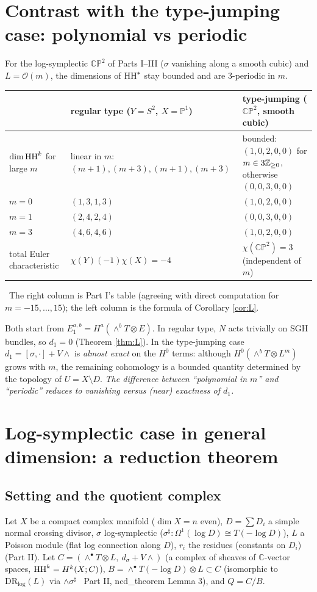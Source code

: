 \section{Contrast with the type-jumping case: polynomial vs periodic}\label{sec:contrast}
For the log-symplectic $\mathbb{CP}^2$ of Parts I--III ($\sigma$ vanishing along a smooth cubic) and $L=\mathcal O(m)$, the dimensions of $\mathrm{HH}^*$ stay bounded and are 3-periodic in $m$.
\begin{center}\small
\begin{tabular}{p{3.6cm}p{4.0cm}p{5.4cm}}\toprule
 & regular type ($Y=S^2$, $X=\mathbb P^1$) & type-jumping ($\mathbb{CP}^2$, smooth cubic)\\\midrule
$\dim\mathrm{HH}^k$ for large $m$ & linear in $m$: $(m+1),(m+3),(m+1),(m+3)$ & bounded: $(1,0,2,0,0)$ for $m\in3\mathbb Z_{\ge0}$, otherwise $(0,0,3,0,0)$\\\midrule
$m=0$ & $(1,3,1,3)$ & $(1,0,2,0,0)$\\\midrule
$m=1$ & $(2,4,2,4)$ & $(0,0,3,0,0)$\\\midrule
$m=3$ & $(4,6,4,6)$ & $(1,0,2,0,0)$\\\midrule
total Euler characteristic & $\chi(Y)(-1)\chi(X)=-4$ & $\chi(\mathbb{CP}^2)=3$ (independent of $m$)\\\bottomrule
\end{tabular}
\end{center}
\tV\ The right column is Part I's table (agreeing with direct computation for $m=-15,\dots,15$); the left column is the formula of Corollary \ref{cor:L}.
\begin{obs}\tP\label{obs:contrast}
Both start from $E_1^{a,b}=H^a(\wedge^bT\otimes E)$. In regular type, $N$ acts trivially on SGH bundles, so $d_1=0$ (Theorem \ref{thm:L}). In the type-jumping case $d_1=[\sigma,\cdot]+V\wedge$ is \emph{almost exact} on the $H^0$ terms: although $H^0(\wedge^bT\otimes L^m)$ grows with $m$, the remaining cohomology is a bounded quantity determined by the topology of $U=X\setminus D$. \emph{The difference between ``polynomial in $m$'' and ``periodic'' reduces to vanishing versus (near) exactness of $d_1$.}
\end{obs}

\section{Log-symplectic case in general dimension: a reduction theorem}\label{sec:log}
\subsection{Setting and the quotient complex}\label{sec:Q}
Let $X$ be a compact complex manifold ($\dim X=n$ even), $D=\sum D_i$ a simple normal crossing divisor, $\sigma$ log-symplectic ($\sigma^\sharp:\Omega^1(\log D)\cong T(-\log D)$), $L$ a Poisson module (flat log connection along $D$), $r_i$ the residues (constants on $D_i$) (Part II). Let $C=(\wedge^\bullet T\otimes L,\ d_\sigma+V\wedge)$ (a complex of sheaves of $\mathbb C$-vector spaces, $\mathrm{HH}^k=H^k(X;C)$), $B=\wedge^\bullet T(-\log D)\otimes L\subset C$ (isomorphic to $\mathrm{DR}_{\log}(L)$ via $\wedge\sigma^\sharp$ \tC\ Part II, ncd\_theorem Lemma 3), and $Q=C/B$.

